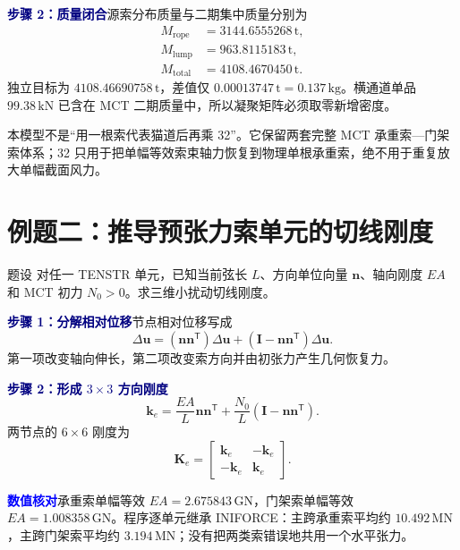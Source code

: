 \documentclass[11pt,a4paper]{article}
\newcommand{\T}{\mathsf{T}}
\newcommand{\Step}[1]{\par\medskip\noindent\textcolor{Navy}{\bfseries 步骤 #1}\quad}
\newcommand{\NumCheck}{\par\medskip\noindent\textcolor{Blue}{\bfseries 数值核对}\quad}
\begin{document}
\Step{2：质量闭合}源索分布质量与二期集中质量分别为
\begin{align}
M_{\mathrm{rope}}&=3144.6555268\,\mathrm t,\\
M_{\mathrm{lump}}&=963.8115183\,\mathrm t,\\
M_{\mathrm{total}}&=4108.4670450\,\mathrm t.
\end{align}
独立目标为 $4108.46690758\,\mathrm t$，差值仅 $0.00013747\,\mathrm t=0.137\,\mathrm{kg}$。横通道单品 $99.38\,\mathrm{kN}$ 已含在 MCT 二期质量中，所以凝聚矩阵必须取零新增密度。

\begin{answerbox}[本题答案]
本模型不是“用一根索代表猫道后再乘 32”。它保留两套完整 MCT 承重索—门架索体系；32 只用于把单幅等效索束轴力恢复到物理单根承重索，绝不用于重复放大单幅截面风力。
\end{answerbox}

\section{例题二：推导预张力索单元的切线刚度}
\begin{problem}{题设}
对任一 TENSTR 单元，已知当前弦长 $L$、方向单位向量 $\bm n$、轴向刚度 $EA$ 和 MCT 初力 $N_0>0$。求三维小扰动切线刚度。
\end{problem}

\Step{1：分解相对位移}节点相对位移写成
\begin{equation}
\Delta\bm u=(\bm n\bm n^{\T})\Delta\bm u+
(\bm I-\bm n\bm n^{\T})\Delta\bm u.
\end{equation}
第一项改变轴向伸长，第二项改变索方向并由初张力产生几何恢复力。

\Step{2：形成 $3\times3$ 方向刚度}
\begin{equation}
\boxed{\bm k_e=\frac{EA}{L}\bm n\bm n^{\T}
+\frac{N_0}{L}\left(\bm I-\bm n\bm n^{\T}\right)}.
\end{equation}
两节点的 $6\times6$ 刚度为
\begin{equation}
\bm K_e=
\begin{bmatrix}
\bm k_e&-\bm k_e\\
-\bm k_e&\bm k_e
\end{bmatrix}.
\end{equation}

\NumCheck 承重索单幅等效 $EA=2.675843\,\mathrm{GN}$，门架索单幅等效 $EA=1.008358\,\mathrm{GN}$。程序逐单元继承 INIFORCE：主跨承重索平均约 $10.492\,\mathrm{MN}$，主跨门架索平均约 $3.194\,\mathrm{MN}$；没有把两类索错误地共用一个水平张力。
\end{document}
